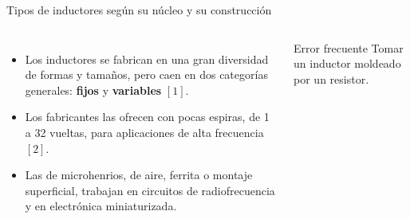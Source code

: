 \documentclass[aspectratio=169,11pt,xcolor={table}]{beamer}
\begin{document}
\begin{frame}{{\normalsize Tipos de inductores según su núcleo y su construcción}}
\begin{columns}[c,onlytextwidth]
\small
\begin{itemize}\setlength{\itemsep}{4pt}
  \item Los inductores se fabrican en una gran diversidad de formas y tamaños, pero caen en dos categorías generales: \textbf{fijos} y \textbf{variables} $[1]$.
  \item Los fabricantes las ofrecen con pocas espiras, de 1 a 32 vueltas, para aplicaciones de alta frecuencia $[2]$.
  \item Las de microhenrios, de aire, ferrita o montaje superficial, trabajan en circuitos de radiofrecuencia y en electrónica miniaturizada.
\end{itemize}
\begin{cardO}{Error frecuente}
\footnotesize Tomar un inductor moldeado por un resistor.
\end{cardO}
\end{columns}
\end{frame}
\end{document}
